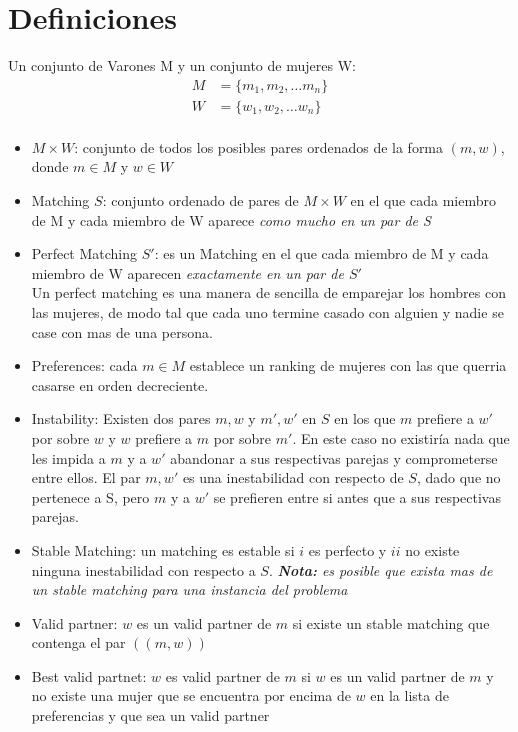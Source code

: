 \documentclass[12pt, fleqn]{article}
\theoremstyle{remark}
\theoremstyle{definition}
\begin{document}
\section{Definiciones}
    Un conjunto de Varones M y un conjunto de mujeres W: 
\[
\begin{split}
    M &= \{m_1,m_2, \dots m_n\} \\
    W &= \{w_1,w_2, \dots w_n\}  \\
\end{split}
\]
\begin{itemize}
    \item $M \times W $: conjunto de todos los posibles pares ordenados de la forma
            $(m, w)$, donde $m \in M$ y  $w \in W$
    \item Matching $S$: conjunto ordenado de pares de $M \times W$ en el que cada
             miembro de M y cada miembro de W aparece \emph{como mucho en un par de S}
    \item Perfect Matching $S'$: es un Matching en el que cada miembro de M y cada miembro 
            de W aparecen \emph{exactamente en un par de $S'$}\\
            Un perfect matching es una manera de sencilla de emparejar los hombres con las 
            mujeres, de modo tal que cada uno termine casado con alguien y nadie se case 
            con mas de una persona.
    \item Preferences: cada $m \in M$ establece un ranking de mujeres con las que
            querria casarse en orden decreciente. 
    \item Instability: Existen dos pares $m,w$ y $m', w'$ en $S$ en los que 
            $m$ prefiere a $w'$ por sobre $w$ y $w$ prefiere a $m$ por sobre $m'$.
            En este caso no existiría nada que les impida a $m$ y a $w'$ abandonar a sus 
            respectivas parejas y comprometerse entre ellos. El par $m,w'$ es una
            inestabilidad con respecto de $S$, dado que no pertenece a S, 
            pero $m$ y a $w'$ se prefieren entre si antes que a sus respectivas parejas.
    \item Stable Matching: un matching es estable si $i$ es perfecto y $ii$ no existe
            ninguna inestabilidad con respecto a $S$. 
            \emph{\textbf{Nota:} es posible que exista mas de un stable matching para una 
                instancia del problema} 
    \item Valid partner: $w$ es un valid partner de $m$ si existe un stable matching que
            contenga el par $((m,w))$
    \item Best valid partnet: $w$ es valid partner de $m$ si $w$ es un valid partner 
            de $m$ y no existe una mujer  que se encuentra por encima de $w$ en la lista
            de preferencias y que sea un valid partner       
\end{itemize}
\end{document}
